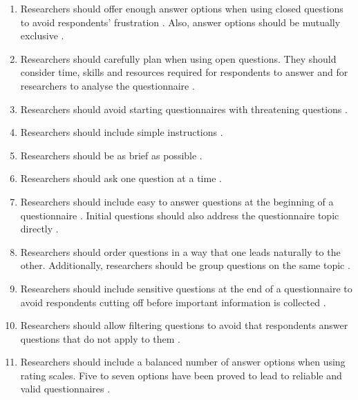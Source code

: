 \begin{enumerate}
    \item Researchers should offer enough answer options when using closed questions to avoid respondents' frustration \autocite{Boynton2004c}. Also, answer options should be mutually exclusive \autocite{Krosnick2009}.
    
    \item Researchers should carefully plan when using open questions. They should consider time, skills and resources required for respondents to answer and for researchers to analyse the questionnaire \autocite{Boynton2004c}.
    
    \item Researchers should avoid starting questionnaires with threatening questions \autocite{Diem}.
    
    \item Researchers should include simple instructions \autocite{Diem}.
    
    \item Researchers should be as brief as possible \autocite{Diem}.
    
    \item Researchers should ask one question at a time \autocite{Diem,Krosnick2009}.
    
    \item Researchers should include easy to answer questions at the beginning of a questionnaire \autocite{Crawford1997,Krosnick2009}. Initial questions should also address the questionnaire topic directly \autocite{Krosnick2009}.
    
    \item Researchers should order questions in a way that one leads naturally to the other. Additionally, researchers should be group questions on the same topic \autocite{Crawford1997,Krosnick2009}.
    
    \item Researchers should include sensitive questions at the end of a questionnaire to avoid respondents cutting off before important information is collected \autocite{Crawford1997,Krosnick2009}.
    
    \item Researchers should allow filtering questions to avoid that respondents answer questions that do not apply to them \autocite{Krosnick2009}.
    
    \item Researchers should include a balanced number of answer options when using rating scales. Five to seven options have been proved to lead to reliable and valid questionnaires \autocite{Krosnick2009}.
    

\end{enumerate}
